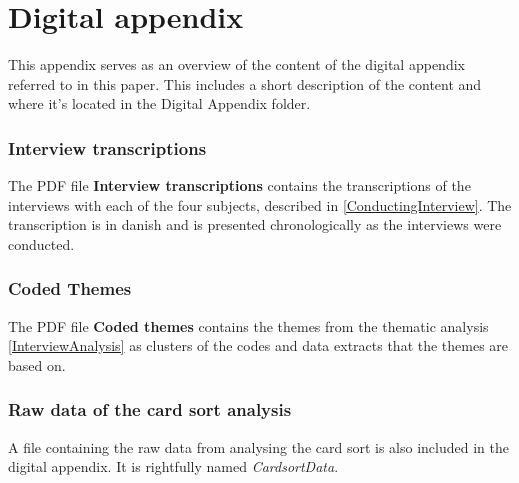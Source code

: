 \chapter{Digital appendix}
\label{DigitalAppendix}
%
This appendix serves as an overview of the content of the digital appendix referred to in this paper. This includes a short description of the content and where it's located in the Digital Appendix folder. 

\subsection*{Interview transcriptions}
%
The PDF file \textbf{Interview transcriptions} contains the transcriptions of the interviews with each of the four subjects, described in \autoref{ConductingInterview}. The transcription is in danish and is presented chronologically as the interviews were conducted.

\subsection*{Coded Themes}
% 
The PDF file \textbf{Coded themes} contains the themes from the thematic analysis \autoref{InterviewAnalysis} as clusters of the codes and data extracts that the themes are based on.

\subsection*{Raw data of the card sort analysis}
%
A file containing the raw data from analysing the card sort is also included in the digital appendix. It is rightfully named \textit{CardsortData}.